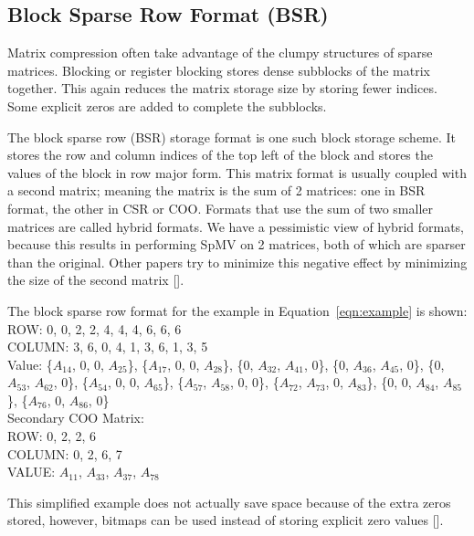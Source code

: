 \subsection{Block Sparse Row Format (BSR)}
\label{sec:bsr}
\par Matrix compression often take advantage of the clumpy structures of sparse matrices. Blocking or register blocking stores dense subblocks of the matrix together. This again reduces the matrix storage size by storing fewer indices. Some explicit zeros are added to complete the subblocks.
\par The block sparse row (BSR) storage format is one such block storage scheme. It stores the row and column indices of the top left of the block and stores the values of the block in row major form. This matrix format is usually coupled with a second matrix; meaning the matrix is the sum of 2 matrices: one in BSR format, the other in CSR or COO. Formats that use the sum of two smaller matrices are called hybrid formats. We have a pessimistic view of hybrid formats, because this results in performing SpMV on 2 matrices, both of which are sparser than the original. Other papers try to minimize this negative effect by minimizing the size of the second matrix [\cite{prelim:wang1,prelim:vuduc}]. \par
The block sparse row format for the example in Equation~\ref{eqn:example} is shown:\\
ROW: 0, 0, 2, 2, 4, 4, 4, 6, 6, 6\\
COLUMN: 3, 6, 0, 4, 1, 3, 6, 1, 3, 5 \\
Value: \{$A_{14}$, $0$, $0$, $A_{25}$\}, \{$A_{17}$, $0$, $0$, $A_{28}$\}, \{$0$, $A_{32}$, $A_{41}$, $0$\}, \{$0$, $A_{36}$, $A_{45}$, $0$\}, \{$0$, $A_{53}$, $A_{62}$, $0$\}, \{$A_{54}$, $0$, $0$, $A_{65}$\}, \{$A_{57}$, $A_{58}$, $0$, $0$\}, \{$A_{72}$, $A_{73}$, $0$, $A_{83}$\}, \{$0$, $0$, $A_{84}$, $A_{85}$\}, \{$A_{76}$, $0$, $A_{86}$, $0$\}\\
Secondary COO Matrix:\\
ROW: 0, 2, 2, 6\\
COLUMN: 0, 2, 6, 7\\
VALUE: $A_{11}$, $A_{33}$, $A_{37}$, $A_{78}$\par
This simplified example does not actually save space because of the extra zeros stored, however, bitmaps can be used instead of storing explicit zero values [\cite{prelim:buluc}].
